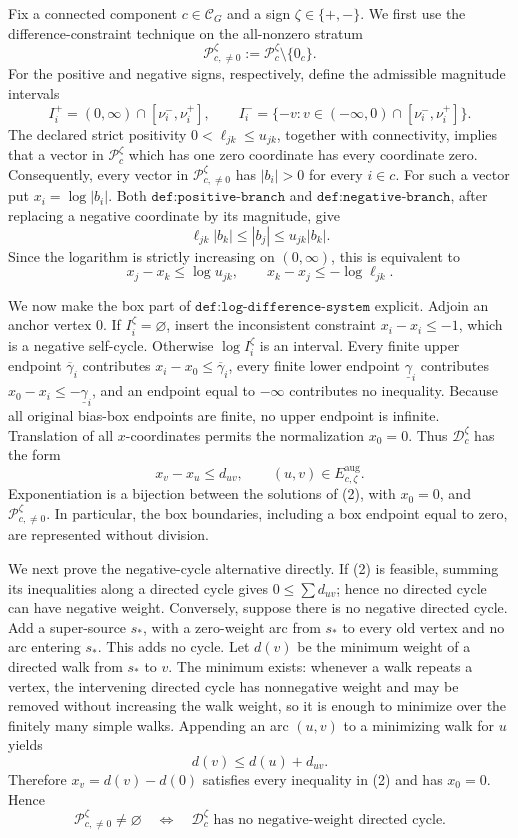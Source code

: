Fix a connected component \(c\in\mathcal C_G\) and a sign \(\zeta\in\{+,-\}\).  We first use the difference-constraint technique on the all-nonzero stratum
\[
\mathcal P_{c,\ne0}^{\zeta}:=\mathcal P_c^{\zeta}\setminus\{0_c\}.
\]
For the positive and negative signs, respectively, define the admissible magnitude intervals
\[
 I_i^+=(0,\infty)\cap[\nu_i^-,\nu_i^+],
 \qquad
 I_i^-=\{-v:v\in(-\infty,0)\cap[\nu_i^-,\nu_i^+]\}.
\]
The declared strict positivity \(0<\ell_{jk}\le u_{jk}\), together with connectivity, implies that a vector in \(\mathcal P_c^{\zeta}\) which has one zero coordinate has every coordinate zero.  Consequently, every vector in \(\mathcal P_{c,\ne0}^{\zeta}\) has \(|b_i|>0\) for every \(i\in c\).  For such a vector put \(x_i=\log|b_i|\).  Both \(\texttt{def:positive-branch}\) and \(\texttt{def:negative-branch}\), after replacing a negative coordinate by its magnitude, give
\[
 \ell_{jk}|b_k|\le |b_j|\le u_{jk}|b_k|.
\]
Since the logarithm is strictly increasing on \((0,\infty)\), this is equivalent to
\[
 x_j-x_k\le\log u_{jk},
 \qquad
 x_k-x_j\le-\log\ell_{jk}.
\tag{1}
\]

We now make the box part of \(\texttt{def:log-difference-system}\) explicit.  Adjoin an anchor vertex \(0\).  If \(I_i^{\zeta}=\varnothing\), insert the inconsistent constraint \(x_i-x_i\le-1\), which is a negative self-cycle.  Otherwise \(\log I_i^{\zeta}\) is an interval.  Every finite upper endpoint \(\overline\gamma_i\) contributes \(x_i-x_0\le\overline\gamma_i\), every finite lower endpoint \(\underline\gamma_i\) contributes \(x_0-x_i\le-\underline\gamma_i\), and an endpoint equal to \(-\infty\) contributes no inequality.  Because all original bias-box endpoints are finite, no upper endpoint is infinite.  Translation of all \(x\)-coordinates permits the normalization \(x_0=0\).  Thus \(\mathcal D_c^{\zeta}\) has the form
\[
 x_v-x_u\le d_{uv},\qquad (u,v)\in E_{c,\zeta}^{\mathrm{aug}}.
\tag{2}
\]
Exponentiation is a bijection between the solutions of (2), with \(x_0=0\), and \(\mathcal P_{c,\ne0}^{\zeta}\).  In particular, the box boundaries, including a box endpoint equal to zero, are represented without division.

We next prove the negative-cycle alternative directly.  If (2) is feasible, summing its inequalities along a directed cycle gives \(0\le\sum d_{uv}\); hence no directed cycle can have negative weight.  Conversely, suppose there is no negative directed cycle.  Add a super-source \(s_*\), with a zero-weight arc from \(s_*\) to every old vertex and no arc entering \(s_*\).  This adds no cycle.  Let \(d(v)\) be the minimum weight of a directed walk from \(s_*\) to \(v\).  The minimum exists: whenever a walk repeats a vertex, the intervening directed cycle has nonnegative weight and may be removed without increasing the walk weight, so it is enough to minimize over the finitely many simple walks.  Appending an arc \((u,v)\) to a minimizing walk for \(u\) yields
\[
 d(v)\le d(u)+d_{uv}.
\]
Therefore \(x_v=d(v)-d(0)\) satisfies every inequality in (2) and has \(x_0=0\).  Hence
\[
 \mathcal P_{c,\ne0}^{\zeta}\ne\varnothing
 \quad\Longleftrightarrow\quad
 \mathcal D_c^{\zeta}\text{ has no negative-weight directed cycle}.
\tag{3}
\]

